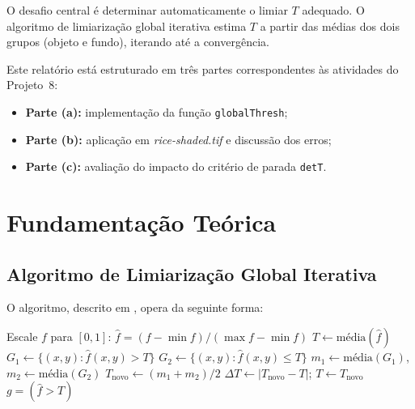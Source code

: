\documentclass[12pt,a4paper,oneside,brazil,chapter=TITLE,section=TITLE]{abntex2}
\begin{document}
O desafio central \'e determinar automaticamente o limiar $T$ adequado.
O algoritmo de limiariza\c{c}\~ao global iterativa \cite{gonzalez2018}
estima $T$ a partir das m\'edias dos dois grupos (objeto e fundo),
iterando at\'e a converg\^encia.

Este relat\'orio est\'a estruturado em tr\^es partes correspondentes
\`as atividades do Projeto~8:
\begin{itemize}
  \item \textbf{Parte (a):} implementa\c{c}\~ao da fun\c{c}\~ao
        \texttt{globalThresh};
  \item \textbf{Parte (b):} aplica\c{c}\~ao em \textit{rice-shaded.tif}
        e discuss\~ao dos erros;
  \item \textbf{Parte (c):} avalia\c{c}\~ao do impacto do crit\'erio
        de parada \texttt{detT}.
\end{itemize}

\chapter{Fundamenta\c{c}\~ao Te\'orica}

\section{Algoritmo de Limiariza\c{c}\~ao Global Iterativa}

O algoritmo, descrito em , opera da seguinte
forma:

\begin{algorithm}[H]
\caption{Limiariza\c{c}\~ao global iterativa}
\begin{algorithmic}[1]
  \State Escale $f$ para $[0,1]$: $\hat{f} = (f - \min f) / (\max f - \min f)$
  \State $T \leftarrow \text{m\'edia}(\hat{f})$
  \Repeat
    \State $G_1 \leftarrow \{(x,y) : \hat{f}(x,y) > T\}$ 
    \State $G_2 \leftarrow \{(x,y) : \hat{f}(x,y) \leq T\}$ 
    \State $m_1 \leftarrow \text{m\'edia}(G_1)$, \quad $m_2 \leftarrow \text{m\'edia}(G_2)$
    \State $T_{\text{novo}} \leftarrow (m_1 + m_2) / 2$
    \State $\Delta T \leftarrow |T_{\text{novo}} - T|$; \quad $T \leftarrow T_{\text{novo}}$
  \State \Return $g = (\hat{f} > T)$
\end{algorithmic}
\end{algorithm}
\end{document}

